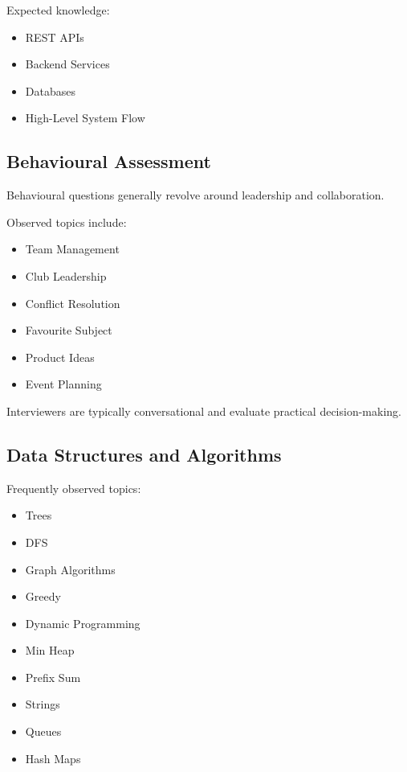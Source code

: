\documentclass[11pt,a4paper]{article}
\begin{document}
Expected knowledge:

\begin{itemize}
	\item REST APIs
	\item Backend Services
	\item Databases
	\item High-Level System Flow
\end{itemize}


\subsection{Behavioural Assessment}

Behavioural questions generally revolve around leadership and collaboration.

Observed topics include:

\begin{itemize}
	\item Team Management
	\item Club Leadership
	\item Conflict Resolution
	\item Favourite Subject
	\item Product Ideas
	\item Event Planning
\end{itemize}

Interviewers are typically conversational and evaluate practical decision-making.


\subsection{Data Structures and Algorithms}

Frequently observed topics:

\begin{itemize}
	\item Trees
	\item DFS
	\item Graph Algorithms
	\item Greedy
	\item Dynamic Programming
	\item Min Heap
	\item Prefix Sum
	\item Strings
	\item Queues
	\item Hash Maps
\end{itemize}
\end{document}
